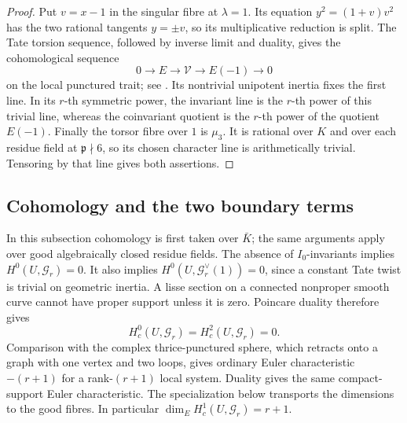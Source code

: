\begin{proof}
Put \(v=x-1\) in the singular fibre at \(\lambda=1\). Its equation
\(y^2=(1+v)v^2\) has the two rational tangents \(y=\pm v\), so its
multiplicative reduction is split. The Tate torsion sequence, followed by
inverse limit and duality, gives the cohomological sequence
\[
 0\longrightarrow E\longrightarrow\mathcal V
      \longrightarrow E(-1)\longrightarrow0
\]
on the local punctured trait; see \cite[pp.~18--19]{Tate}.
Its nontrivial unipotent inertia fixes the first line. In its \(r\)-th
symmetric power, the invariant line is the \(r\)-th power of this
trivial line, whereas the coinvariant quotient is the \(r\)-th power
of the quotient \(E(-1)\). Finally the torsor fibre over \(1\) is
\(\mu_3\). It is rational over \(K\) and over each residue field at
\(\mathfrak p\nmid6\), so its chosen character line is arithmetically
trivial. Tensoring by that line gives both assertions.
\end{proof}

\subsection{Cohomology and the two boundary terms}

In this subsection cohomology is first taken over \(\bar K\); the same
arguments apply over good algebraically closed residue fields.
The absence of \(I_0\)-invariants implies
\(H^0(U,\mathcal G_r)=0\). It also implies
\(H^0(U,\mathcal G_r^\vee(1))=0\), since a constant Tate twist is
trivial on geometric inertia. A lisse section on a connected nonproper
smooth curve cannot have proper support unless it is zero. Poincare
duality \cite[Theorem~24.1]{Milne} therefore gives
\begin{equation}\label{eq:common-vanishing}
 H_c^0(U,\mathcal G_r)=H_c^2(U,\mathcal G_r)=0.
\end{equation}
Comparison with the complex thrice-punctured sphere, which retracts
onto a graph with one vertex and two loops, gives ordinary Euler
characteristic \(-(r+1)\) for a rank-\((r+1)\) local system.
Duality gives the same compact-support Euler characteristic. The
specialization below transports the dimensions to the good fibres.
In particular
\(\dim_E H_c^1(U,\mathcal G_r)=r+1\).


